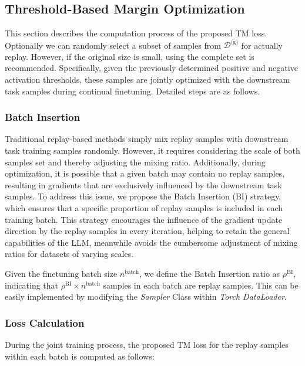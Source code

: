 \subsection{Threshold-Based Margin Optimization}\label{sec:tm}
This section describes the computation process of the proposed TM loss.
Optionally we can randomly select a subset of samples from $\mathcal{D}^{\text{(g)}}$ for actually replay. However, if the original size is small, using the complete set is recommended.
Specifically, given the previously determined positive and negative activation thresholds, these samples are jointly optimized with the downstream task samples during continual finetuning. Detailed steps are as follows.

\subsubsection{Batch Insertion} \label{sec:BI}
Traditional replay-based methods simply mix replay samples with downstream task training samples randomly. However, it requires considering the scale of both samples set and thereby adjusting the mixing ratio. Additionally, during optimization, it is possible that a given batch may contain no replay samples, resulting in gradients that are exclusively influenced by the downstream task samples. To address this issue, we propose the Batch Insertion (BI) strategy, which ensures that a specific proportion of replay samples is included in each training batch. This strategy encourages the influence of the gradient update direction by the replay samples in every iteration, helping to retain the general capabilities of the LLM, meanwhile avoids the cumbersome adjustment of mixing ratios for datasets of varying scales.

Given the finetuning batch size $n^{\text{batch}}$, we define the Batch Insertion ratio as $\rho^{\text{BI}}$, indicating that $\rho^{\text{BI}} \times n^{\text{batch}}$ samples in each batch are replay samples. This can be easily implemented by modifying the \textit{Sampler} Class within \textit{Torch DataLoader}.


\subsubsection{Loss Calculation} 
During the joint training process, the proposed TM loss for the replay samples within each batch is computed as follows:  

